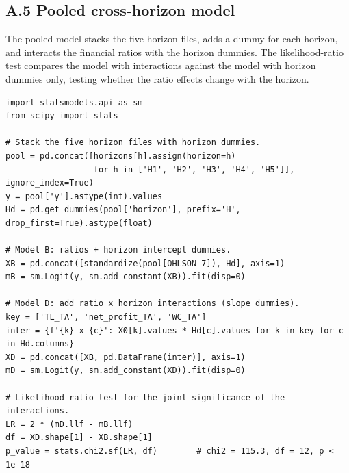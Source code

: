 \documentclass[12pt,a4paper]{article}
\begin{document}
\subsection*{A.5 Pooled cross-horizon model}

The pooled model stacks the five horizon files, adds a dummy for each horizon,
and interacts the financial ratios with the horizon dummies. The likelihood-ratio
test compares the model with interactions against the model with horizon dummies
only, testing whether the ratio effects change with the horizon.

\begin{lstlisting}[style=python]
import statsmodels.api as sm
from scipy import stats

# Stack the five horizon files with horizon dummies.
pool = pd.concat([horizons[h].assign(horizon=h)
                  for h in ['H1', 'H2', 'H3', 'H4', 'H5']], ignore_index=True)
y = pool['y'].astype(int).values
Hd = pd.get_dummies(pool['horizon'], prefix='H', drop_first=True).astype(float)

# Model B: ratios + horizon intercept dummies.
XB = pd.concat([standardize(pool[OHLSON_7]), Hd], axis=1)
mB = sm.Logit(y, sm.add_constant(XB)).fit(disp=0)

# Model D: add ratio x horizon interactions (slope dummies).
key = ['TL_TA', 'net_profit_TA', 'WC_TA']
inter = {f'{k}_x_{c}': X0[k].values * Hd[c].values for k in key for c in Hd.columns}
XD = pd.concat([XB, pd.DataFrame(inter)], axis=1)
mD = sm.Logit(y, sm.add_constant(XD)).fit(disp=0)

# Likelihood-ratio test for the joint significance of the interactions.
LR = 2 * (mD.llf - mB.llf)
df = XD.shape[1] - XB.shape[1]
p_value = stats.chi2.sf(LR, df)        # chi2 = 115.3, df = 12, p < 1e-18
\end{lstlisting}
\end{document}
